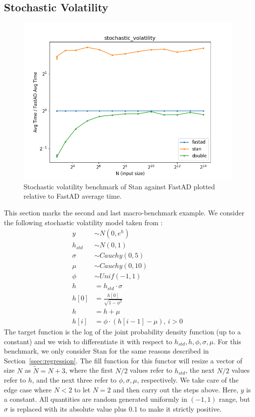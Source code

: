 \subsection{Stochastic Volatility}\label{ssec:stochastic_volatility}

\begin{figure}[t]
    \centering
    \includegraphics[width=\textwidth]{figs/stochastic_volatility_fig.png}
    \caption{%
        Stochastic volatility benchmark of Stan against FastAD 
        plotted relative to FastAD average time.
    }\label{fig:stochastic_volatility}
\end{figure}

This section marks the second and last macro-benchmark example.
We consider the following stochastic volatility model 
taken from :
\begin{align*}
    y &\sim N(0, e^{h}) \\
    h_{std} &\sim N(0, 1) \\
    \sigma &\sim Cauchy(0,5) \\
    \mu &\sim Cauchy(0,10) \\
    \phi &\sim Unif(-1, 1) \\
    h &= h_{std} \cdot \sigma \\
    h[0] &= \frac{h[0]}{\sqrt{1 - \phi^2}} \\
    h &= h + \mu \\
    h[i] &= \phi \cdot (h[i-1] - \mu),\, i > 0
\end{align*}
The target function is the log of the joint probability density function (up to a constant)
and we wish to differentiate it with respect to $h_{std}, h, \phi, \sigma, \mu$.
For this benchmark, we only consider Stan for the same reasons described in Section~\ref{ssec:regression}.
The fill function for this functor will resize a vector of size $N$ as $\tilde{N} = N + 3$,
where the first $N/2$ values refer to $h_{std}$,
the next $N/2$ values refer to $h$,
and the next three refer to $\phi, \sigma, \mu$, respectively.
We take care of the edge case where $N < 2$ to let $N = 2$ and then carry out the steps above.
Here, $y$ is a constant.
All quantities are random generated uniformly in $(-1,1)$ range,
but $\sigma$ is replaced with its absolute value plus $0.1$ to make it strictly positive.


